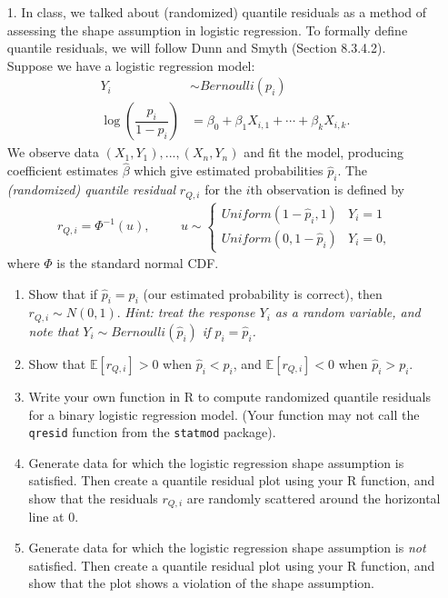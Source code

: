 \documentclass[11pt]{article}
\begin{document}
\begin{enumerate}
\item[1.] In class, we talked about (randomized) quantile residuals as a method of assessing the shape assumption in logistic regression. To formally define quantile residuals, we will follow Dunn and Smyth (Section 8.3.4.2).\\

Suppose we have a logistic regression model:
\begin{align*}
Y_i & \sim Bernoulli(p_i) \\
\log \left( \dfrac{p_i}{1 - p_i} \right) &= \beta_0 + \beta_1 X_{i,1} + \cdots + \beta_k X_{i,k}.
\end{align*}
We observe data $(X_1, Y_1), ..., (X_n, Y_n)$ and fit the model, producing coefficient estimates $\widehat{\beta}$ which give estimated probabilities $\widehat{p}_i$. The \textit{(randomized) quantile residual} $r_{Q,i}$ for the $i$th observation is defined by
\begin{align*}
r_{Q, i} = \Phi^{-1}(u), \hspace{1cm} u \sim \begin{cases}
Uniform(1 - \widehat{p}_i, 1) & Y_i = 1 \\
Uniform(0, 1 - \widehat{p}_i) & Y_i = 0,
\end{cases}
\end{align*}
where $\Phi$ is the standard normal CDF.

\begin{enumerate}
\item Show that if $\widehat{p}_i = p_i$ (our estimated probability is correct), then $r_{Q,i} \sim N(0, 1)$. \textit{Hint: treat the response $Y_i$ as a random variable, and note that $Y_i \sim Bernoulli(\widehat{p}_i)$ if $p_i = \widehat{p}_i$.}

\item Show that $\mathbb{E}[r_{Q,i}] > 0$ when $\widehat{p}_i < p_i$, and $\mathbb{E}[r_{Q,i}] < 0$ when $\widehat{p}_i > p_i$.

\item Write your own function in R to compute randomized quantile residuals for a binary logistic regression model. (Your function may not call the \texttt{qresid} function from the \texttt{statmod} package).

\item Generate data for which the logistic regression shape assumption is satisfied. Then create a quantile residual plot using your R function, and show that the residuals $r_{Q,i}$ are randomly scattered around the horizontal line at 0.

\item Generate data for which the logistic regression shape assumption is \textit{not} satisfied. Then create a quantile residual plot using your R function, and show that the plot shows a violation of the shape assumption.
\end{enumerate}
\end{enumerate}
\end{document}
